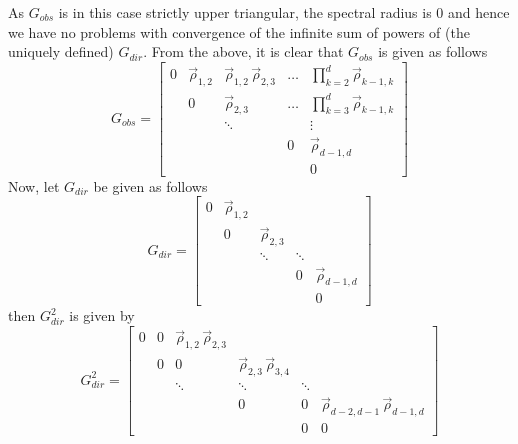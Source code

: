 \documentclass[../Thesis.tex]{subfiles}
\begin{document}
As $G_{obs}$ is in this case strictly upper triangular, the spectral radius is $0$ and hence we have no problems with convergence of the infinite sum of powers of (the uniquely defined) $G_{dir}$. From the above, it is clear that $G_{obs}$ is given as follows
\begin{equation}\label{eq:Gaussian chain G_obs triangular form}
    G_{obs} = \begin{bmatrix}
        0 & \vec{\rho}_{1,2} & \vec{\rho}_{1,2}\,\vec{\rho}_{2,3} & \dots & \prod_{k=2}^{d} \vec{\rho}_{k-1,k} \\
          & 0                & \vec{\rho}_{2,3}                   & \dots & \prod_{k=3}^{d} \vec{\rho}_{k-1,k} \\
          &                  & \ddots                             &       & \vdots                             \\
          &                  &                                    & 0     & \vec{\rho}_{d-1,d}                 \\
          &                  &                                    &       & 0
    \end{bmatrix}
\end{equation}
Now, let $G_{dir}$ be given as follows
$$G_{dir} = \begin{bmatrix}
        0 & \vec{\rho}_{1,2} &                  &        &                    \\
          & 0                & \vec{\rho}_{2,3} &        &                    \\
          &                  & \ddots           & \ddots &                    \\
          &                  &                  & 0      & \vec{\rho}_{d-1,d} \\
          &                  &                  &        & 0
    \end{bmatrix}$$
then $G_{dir}^2$ is given by
$$G_{dir}^2 = \begin{bmatrix}
        0 & 0 & \vec{\rho}_{1,2}   \, \vec{\rho}_{2,3} &                                      &        &                                           \\
          & 0 & 0                                      & \vec{\rho}_{2,3} \, \vec{\rho}_{3,4} &        &                                           \\
          &   & \ddots                                 & \ddots                               & \ddots &                                           \\
          &   &                                        & 0                                    & 0      & \vec{\rho}_{d-2,d-1}\, \vec{\rho}_{d-1,d} \\
          &   &                                        &                                      & 0      & 0
    \end{bmatrix}$$
\end{document}
